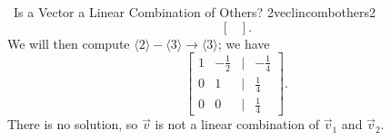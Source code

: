 \begin{example}{\Difficulty\,\Difficulty\,\,Is a Vector a Linear Combination of Others? 2}{veclincombothers2}
\begin{equation*}
\begin{bmatrix}
                \end{bmatrix}.
            \end{equation*}
            We will then compute \(\langle2\rangle-\langle3\rangle\to\langle3\rangle\); we have
            \begin{equation*}
                \begin{bmatrix}
                    1 & -\frac{1}{2} & | & -\frac{1}{4} \\
                    0 & 1 & | & \frac{1}{4} \\
                    0 & 0 & | & \frac{1}{4}
                \end{bmatrix}.
            \end{equation*}
            There is no solution, so \(\vec{v}\) is not a linear combination of \(\vec{v}_1\) and \(\vec{v}_2\).
            
        \end{example}
        \pagebreak
